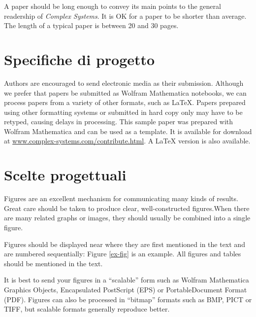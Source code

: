 \documentclass{article}
\begin{document}
A paper should be long enough to convey its main points to the general readership of \textit{Complex Systems}. It is OK for a paper to be shorter
than average. The length of a typical paper is between 20 and 30 pages.

\section{Specifiche di progetto}

Authors are encouraged to send electronic media as their submission. Although we prefer that papers be submitted as Wolfram Mathematica notebooks, we can process papers from a variety of other formats, such as LaTeX. Papers prepared using other formatting systems or submitted in hard copy only may have to be retyped, causing delays in processing. This sample paper was prepared with Wolfram Mathematica and can be used as a template. It is available for download at \url{www.complex-systems.com/contribute.html}. A LaTeX version is also available.

\section{Scelte progettuali}

Figures are an excellent mechanism for communicating many kinds of results. Great care should be taken to produce clear, well-constructed figures.When there are many related graphs or images, they should usually be combined into a single figure. 

Figures should be displayed near where they are first mentioned in the text and are numbered sequentially: Figure \ref{ex-fig} is an example. All figures and tables should be mentioned in the text.

It is best to send your figures in a {``}scalable{''} form such as Wolfram Mathematica Graphics Objects, Encapsulated PostScript (EPS) or PortableDocument Format (PDF). Figures can also be processed in {``}bitmap{''} formats such as BMP, PICT or TIFF, but scalable formats generally reproduce better.

 
\end{document}
